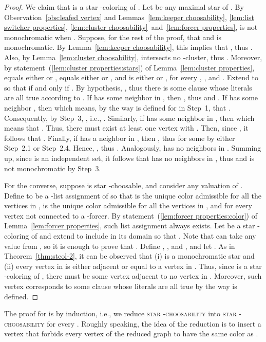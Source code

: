 \documentclass[a4paper, 11pt, oneside]{article}
\newcommand{\stchose}[1]{\textsc{star -choosability}}
\begin{document}
\begin{proof}
  We claim that  is a star -coloring of .  Let  be any maximal star of .  By Observation~\ref{obs:leafed vertex} and Lemmas~\ref{lem:keeper choosability}, \ref{lem:list switcher properties},  \ref{lem:cluster choosability}~and~\ref{lem:forcer properties},  is not monochromatic when .  Suppose, for the rest of the proof, that  and  is monochromatic.  By Lemma~\ref{lem:keeper choosability}, this implies that , thus .  Also, by Lemma~\ref{lem:cluster choosability},  intersects no -cluster, thus .  Moreover, by statement~(\ref{lem:cluster properties:stars}) of Lemma~\ref{lem:cluster properties},  equals either  or ,  equals either  or , and  is either  or , for every , , and .  Extend  to  so that  if and only if .  By hypothesis, , thus there is some clause  whose literals are all true according to .  If  has some neighbor in , then , thus  and .  If  has some neighbor , then  which means, by the way  is defined for  in Step~1, that .  Consequently, by Step~3, , i.e., .  Similarly, if  has some neighbor in , then  which means that .  Thus, there must exist at least one vertex  with .  Then, since , it follows that .   Finally, if  has a neighbor in , then , thus  for some  by either Step~2.1 or Step~2.4.  Hence, , thus .  Analogously,  has no neighbors in .  Summing up, since  is an independent set, it follows that  has no neighbors in , thus  and  is not monochromatic by Step~3.

  For the converse, suppose  is star -choosable, and consider any valuation  of .  Define  to be a -list assignment of  so that  is the unique color admissible for all the vertices in ,  is the unique color admissible for all the vertices in , and  for every vertex not connected to a -forcer.  By statement~(\ref{lem:forcer properties:color}) of Lemma~\ref{lem:forcer properties}, such list assignment  always exists.  Let  be a star -coloring of  and extend  to include  in its domain so that .  Note that  can take any value from , so it is enough to prove that .  Define , , and , and let .  As in Theorem~\ref{thm:stcol-2}, it can be observed that (i)  is a monochromatic star and (ii) every vertex in  is either adjacent or equal to a vertex in .  Thus, since  is a star -coloring of , there must be some vertex  adjacent to no vertex in .  Moreover, such vertex  corresponds to some clause  whose literals are all true by the way  is defined.
\end{proof}

The proof for  is by induction, i.e., we reduce \stchose{k} into \stchose{(k+1)} for every .  Roughly speaking, the idea of the reduction is to insert a vertex  that forbids every vertex of the reduced graph to have the same color as .
\end{document}
